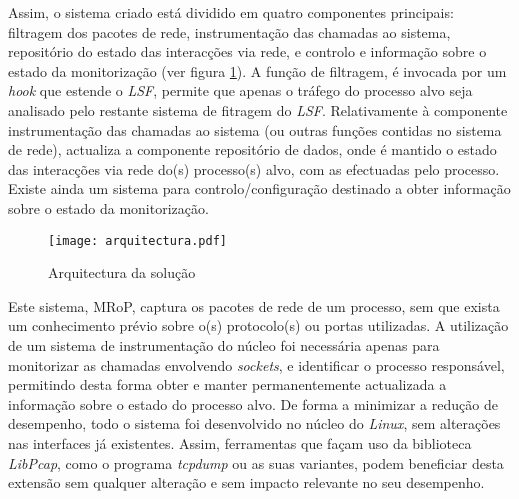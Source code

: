 Assim, o sistema criado está dividido em quatro componentes principais: filtragem dos pacotes de rede, instrumentação das chamadas ao sistema, repositório do estado das interacções via rede, e controlo e informação sobre o estado da monitorização (ver figura \ref{arquitectura}).
A função de filtragem, é invocada por um \textit{hook} que estende o \textit{LSF}, permite que apenas o tráfego do processo alvo seja analisado pelo restante sistema de fitragem do \textit{LSF}.
Relativamente à componente instrumentação das chamadas ao sistema (ou outras funções contidas no sistema de rede), actualiza a componente repositório de dados, onde é mantido o estado das interacções via rede do(s) processo(s) alvo, com as efectuadas pelo processo.
Existe ainda um sistema para controlo/configuração destinado a obter informação sobre o estado da monitorização.

\begin{figure}[htbp]
\begin{center}
\texttt{[image: arquitectura.pdf]} 
\caption{Arquitectura da solução}
\label{arquitectura}
\end{center}
\end{figure}

Este sistema, MRoP, captura os pacotes de rede de um processo, sem que exista um conhecimento prévio sobre o(s) protocolo(s) ou portas utilizadas.
A utilização de um sistema de instrumentação do núcleo foi necessária apenas para monitorizar as chamadas envolvendo \emph{sockets}, e identificar o processo responsável, permitindo desta forma obter e manter permanentemente actualizada a informação sobre o estado do processo alvo.
De forma a minimizar a redução de desempenho, todo o sistema foi desenvolvido no núcleo do \textit{Linux}, sem alterações nas interfaces já existentes.
Assim, ferramentas que façam uso da biblioteca \textit{LibPcap}, como o programa \textit{tcpdump} ou as suas variantes, podem beneficiar desta extensão sem qualquer alteração e sem impacto relevante no seu desempenho.



